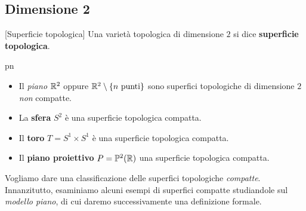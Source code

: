	\subsection{Dimensione 2}
\begin{definition}{}[Superficie topologica]
	Una varietà topologica di dimensione $2$ si dice \textbf{superficie topologica}.
\end{definition}
\begin{example}{pn}~~{}
	\begin{itemize}
		\item Il \textit{piano} $\mathbb{R}^2$ oppure $\mathbb{R}^2\setminus \{n\text{ punti}\}$ sono superfici topologiche di dimensione $2$ \textit{non} compatte.
		\item La \textbf{sfera} $S^2$ è una superficie topologica compatta.
		\item Il \textbf{toro} $T=S^1\times S^1$ è una superficie topologica compatta.
		\item Il \textbf{piano proiettivo} $P=\mathbb{P}^2(\mathbb{R})$ una superficie topologica compatta.
	\end{itemize}
\end{example}
Vogliamo dare una classificazione delle superfici topologiche \textit{compatte}. Innanzitutto, esaminiamo alcuni esempi di superfici compatte studiandole sul \textit{modello piano}, di cui daremo successivamente una definizione formale.
